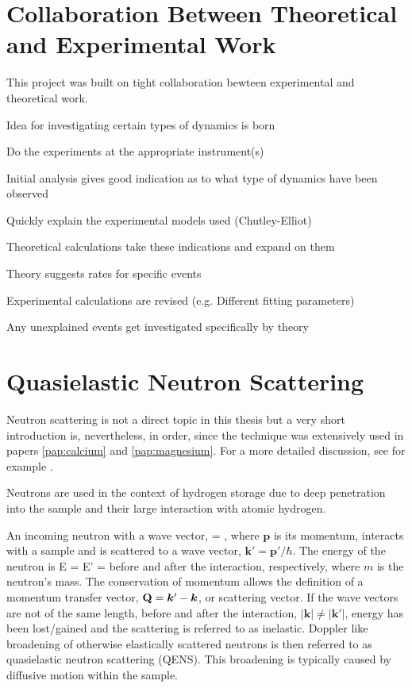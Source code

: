 \section{Collaboration Between Theoretical and Experimental Work}
\label{sec:cooperation}

This project was built on tight collaboration bewteen experimental and theoretical work.
\bit
\item Idea for investigating certain types of dynamics is born
\item Do the experiments at the appropriate instrument(s)
\item Initial analysis gives good indication as to what type of dynamics have been observed
\item Quickly explain the experimental models used (Chutley-Elliot)
\item Theoretical calculations take these indications and expand on them
\item Theory suggests rates for specific events
\item Experimental calculations are revised (e.g. Different fitting parameters)
\item Any unexplained events get investigated specifically by theory
\eit

\placeholder

\section{Quasielastic Neutron Scattering}
\label{sec:qens}

Neutron scattering is not a direct topic in this thesis but a very short introduction is, nevertheless, in order, since the technique was extensively used in papers \ref{pap:calcium} and \ref{pap:magnesium}.
For a more detailed discussion, see for example \citemiss.

Neutrons are used in the context of hydrogen storage due to deep penetration into the sample and their large interaction with atomic hydrogen.~\tred{[B\'ee]}

An incoming neutron with a wave vector,
 = ,
\eeq
where $\bm{p}$ is its momentum, interacts with a sample and is scattered to a wave vector, $\bm{k}' = \bm{p}' / \hbar$.
The energy of the neutron is
E =  \quad {} \quad E' = 
\eeq
before and after the interaction, respectively, where $m$ is the neutron's mass.
The conservation of momentum allows the definition of a momentum transfer vector, ${\mathrm{\mathbf{\bm{Q}}}} = \bm{k}' - \bm{k}$, or scattering vector.
If the wave vectors are not of the same length, before and after the interaction, $\left| \bm{k} \right| \ne \left| \bm{k}' \right|$, energy has been lost/gained and the scattering is referred to as inelastic.
Doppler like broadening of otherwise elastically scattered neutrons is then referred to as quasielastic neutron scattering (QENS).
This broadening is typically caused by diffusive motion within the sample.~\citemiss

